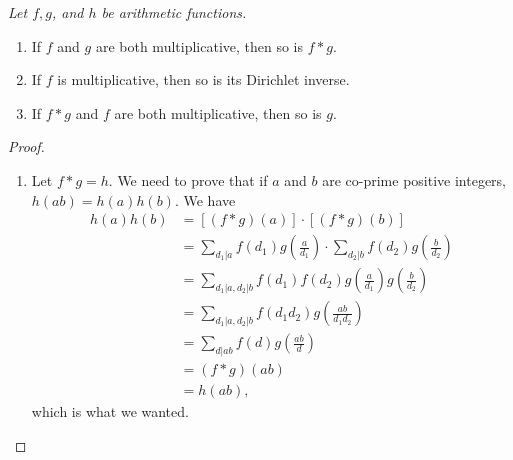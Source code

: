 \documentclass[12pt]{subfile}
\begin{document}
		\begin{theorem} \slshape \label{thm:mft}
			Let $f,g$, and $h$ be arithmetic functions.
				\begin{enumerate}
					\item If $f$ and $g$ are both multiplicative, then so is $f\ast g$.
					\item If $f$ is multiplicative, then so is its Dirichlet inverse.
					\item If $f\ast g$ and $f$ are both multiplicative, then so is $g$.
				\end{enumerate}
		\end{theorem}
		
		
		\begin{proof}
			$ $
			\begin{enumerate}
				\item Let $f\ast g=h$. We need to prove that if $a$ and $b$ are co-prime positive integers, $h(ab)=h(a)h(b)$. We have
					\begin{align*}
						h(a)h(b) &= \left[(f\ast g)(a)\right] \cdot \left[(f\ast g)(b)\right]\\
								 &= \sum\limits_{d_1|a}f(d_1)g\left(\frac{a}{d_1}\right)\cdot \sum\limits_{d_2|b}f(d_2)g\left(\frac{b}{d_2}\right)\\
								 &= \sum\limits_{d_1|a, d_2|b}f(d_1)f(d_2)g\left(\frac{a}{d_1}\right)g\left(\frac{b}{d_2}\right)\\
								 &= \sum\limits_{d_1|a, d_2|b}f(d_1d_2)g\left(\frac{ab}{d_1d_2}\right)\\
								 &= \sum\limits_{d|ab}f(d)g\left(\frac{ab}{d}\right)\\
								 &= (f\ast g)(ab)\\
								 &=h(ab),
					\end{align*}
				which is what we wanted.
				

\end{enumerate}
\end{proof}
\end{document}
